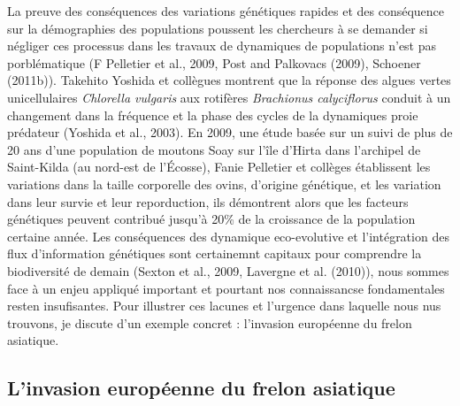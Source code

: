 La preuve des conséquences des variations génétiques rapides et des
conséquence sur la démographies des populations poussent les chercheurs
à se demander si négliger ces processus dans les travaux de dynamiques
de populations n'est pas porblématique (F Pelletier et al., 2009, Post
and Palkovacs (2009), Schoener (2011b)). Takehito Yoshida et collègues
montrent que la réponse des algues vertes unicellulaires \emph{Chlorella
vulgaris} aux rotifères \emph{Brachionus calyciflorus} conduit à un
changement dans la fréquence et la phase des cycles de la dynamiques
proie prédateur (Yoshida et al., 2003). En 2009, une étude basée sur un
suivi de plus de 20 ans d'une population de moutons Soay sur l'île
d'Hirta dans l'archipel de Saint-Kilda (au nord-est de l'Écosse), Fanie
Pelletier et collèges établissent les variations dans la taille
corporelle des ovins, d'origine génétique, et les variation dans leur
survie et leur reporduction, ils démontrent alors que les facteurs
génétiques peuvent contribué jusqu'à 20\% de la croissance de la
population certaine année. Les conséquences des dynamique eco-evolutive
et l'intégration des flux d'information génétiques sont certainemnt
capitaux pour comprendre la biodiversité de demain (Sexton et al., 2009,
Lavergne et al. (2010)), nous sommes face à un enjeu appliqué important
et pourtant nos connaissancse fondamentales resten insufisantes. Pour
illustrer ces lacunes et l'urgence dans laquelle nous nus trouvons, je
discute d'un exemple concret : l'invasion européenne du frelon
asiatique.

\subsection*{L'invasion européenne du frelon
asiatique}\label{linvasion-europuxe9enne-du-frelon-asiatique}

